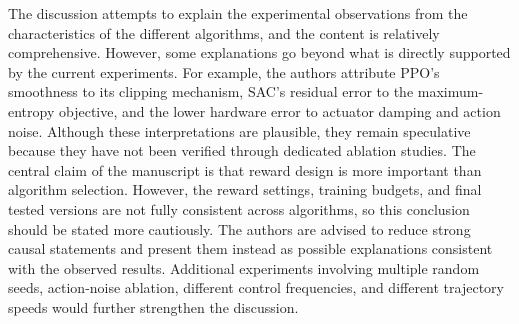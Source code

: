 \documentclass[11pt]{elsarticle}
\begin{document}
\begin{reviewerbox}
The discussion attempts to explain the experimental observations from the characteristics of the different algorithms, and the content is relatively comprehensive. However, some explanations go beyond what is directly supported by the current experiments. For example, the authors attribute PPO's smoothness to its clipping mechanism, SAC's residual error to the maximum-entropy objective, and the lower hardware error to actuator damping and action noise. Although these interpretations are plausible, they remain speculative because they have not been verified through dedicated ablation studies. The central claim of the manuscript is that reward design is more important than algorithm selection. However, the reward settings, training budgets, and final tested versions are not fully consistent across algorithms, so this conclusion should be stated more cautiously. The authors are advised to reduce strong causal statements and present them instead as possible explanations consistent with the observed results. Additional experiments involving multiple random seeds, action-noise ablation, different control frequencies, and different trajectory speeds would further strengthen the discussion.
\end{reviewerbox}
\end{document}
